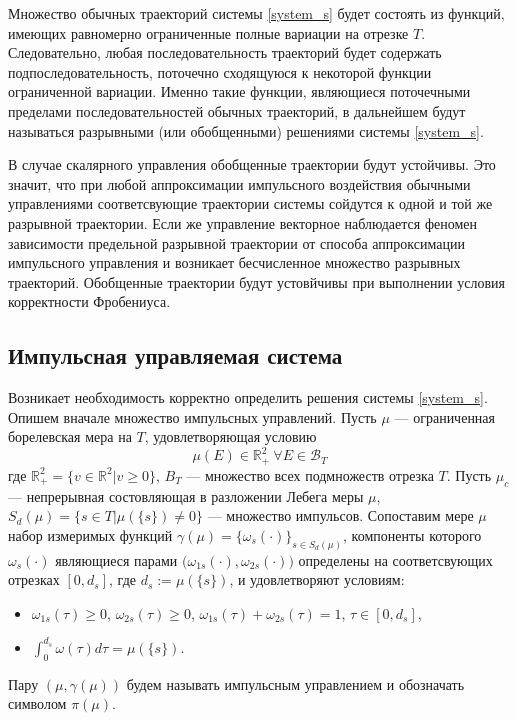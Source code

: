 Множество обычных траекторий системы \eqref{system_s} будет состоять
из функций, имеющих равномерно ограниченные полные вариации на отрезке
$T$. Следовательно, любая последовательность траекторий будет
содержать подпоследовательность, поточечно сходящуюся к некоторой
функции ограниченной вариации. Именно такие функции, являющиеся
поточечными пределами последовательностей обычных траекторий, в
дальнейшем будут называться разрывными (или обобщенными) решениями
системы \eqref{system_s}.

В случае скалярного управления обобщенные траектории будут устойчивы.
Это значит, что при любой аппроксимации импульсного воздействия обычными
управлениями соответсвующие траектории системы сойдутся к одной и той
же разрывной траектории. Если же управление векторное наблюдается
феномен зависимости предельной разрывной траектории от способа
аппроксимации импульсного управления и возникает бесчисленное
множество разрывных траекторий. Обобщенные траектории будут устовйчивы
при выполнении условия корректности Фробениуса. \cite{DS2000}

\subsection{Импульсная управляемая система}
\label{sec:ids}

Возникает необходимость корректно определить решения системы
\eqref{system_s}. Опишем вначале множество импульсных управлений. Пусть $\mu$ ---
ограниченная борелевская мера на $T$, удовлетворяющая условию
\begin{equation*}
  \mu(E) \in \mathbb{R}_+^2 \ \forall E \in \mathcal{B}_T
\end{equation*}
где $\mathbb{R}_+^2 = \{v \in \mathbb{R}^2 | v \ge 0\}$, $B_T$ ---
множество всех подмножеств отрезка $T$. Пусть $\mu_c$ --- непрерывная
состовляющая в разложении Лебега меры $\mu$,
$S_d(\mu) = \{ s \in T | \mu(\{s\}) \neq 0\}$ --- множество
импульсов. Сопоставим мере $\mu$ набор измеримых функций
$\gamma(\mu) = \{ \omega_s(\cdot) \}_{s\in S_d(\mu)}$, компоненты
которого $\omega_s(\cdot)$ являющиеся парами
$\big(\omega_{1s}(\cdot),\omega_{2s}(\cdot)\big)$ определены на
соответсвующих отрезках $[0,d_s]$, где $d_s := \mu(\{s\})$, и
удовлетворяют условиям:
\begin{itemize}
  \item $\omega_{1s}(\tau) \ge 0$, $\omega_{2s}(\tau) \ge 0$, 
    $\omega_{1s}(\tau) + \omega_{2s}(\tau) = 1$, $\tau \in [0,d_s]$,
  \item $\displaystyle\int_{0}^{d_s} \omega(\tau) d\tau = \mu(\{s\})$.
\end{itemize}
Пару $(\mu,\gamma(\mu))$ будем называть импульсным управлением и
обозначать символом $\pi(\mu)$.

